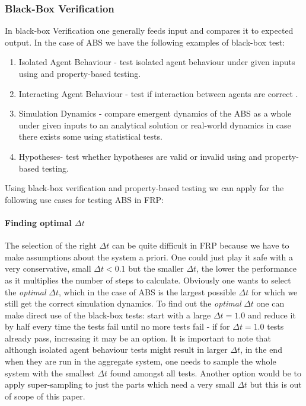 \subsubsection{Black-Box Verification}
In black-box Verification one generally feeds input and compares it to expected output. In the case of ABS we have the following examples of black-box test:
\begin{enumerate}
	\item Isolated Agent Behaviour - test isolated agent behaviour under given inputs using and property-based testing.
	\item Interacting Agent Behaviour - test if interaction between agents are correct .
	\item Simulation Dynamics - compare emergent dynamics of the ABS as a whole under given inputs to an analytical solution or real-world dynamics in case there exists some using statistical tests.
	\item Hypotheses- test whether hypotheses are valid or invalid using and property-based testing. %
\end{enumerate}


Using black-box verification and property-based testing we can apply for the following use cases for testing ABS in FRP:

\paragraph{Finding optimal $\Delta t$}
The selection of the right $\Delta t$ can be quite difficult in FRP because we have to make assumptions about the system a priori. One could just play it safe with a very conservative, small $\Delta t < 0.1$ but the smaller $\Delta t$, the lower the performance as it multiplies the number of steps to calculate. Obviously one wants to select the \textit{optimal} $\Delta t$, which in the case of ABS is the largest possible $\Delta t$ for which we still get the correct simulation dynamics.
To find out the \textit{optimal} $\Delta t$ one can make direct use of the black-box tests: start with a large $\Delta t = 1.0$ and reduce it by half every time the tests fail until no more tests fail - if for $\Delta t = 1.0$ tests already pass, increasing it may be an option. It is important to note that although isolated agent behaviour tests might result in larger $\Delta t$, in the end when they are run in the aggregate system, one needs to sample the whole system with the smallest $\Delta t$ found amongst all tests. Another option would be to apply super-sampling to just the parts which need a very small $\Delta t$ but this is out of scope of this paper.

